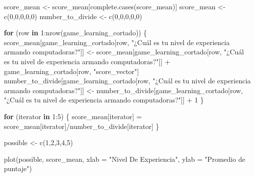 \documentclass[
]{article}
\newenvironment{Shaded}{\begin{snugshade}}{\end{snugshade}}
\newcommand{\AttributeTok}[1]{\textcolor[rgb]{0.77,0.63,0.00}{#1}}
\newcommand{\ControlFlowTok}[1]{\textcolor[rgb]{0.13,0.29,0.53}{\textbf{#1}}}
\newcommand{\DecValTok}[1]{\textcolor[rgb]{0.00,0.00,0.81}{#1}}
\newcommand{\FunctionTok}[1]{\textcolor[rgb]{0.00,0.00,0.00}{#1}}
\newcommand{\NormalTok}[1]{#1}
\newcommand{\OtherTok}[1]{\textcolor[rgb]{0.56,0.35,0.01}{#1}}
\newcommand{\SpecialCharTok}[1]{\textcolor[rgb]{0.00,0.00,0.00}{#1}}
\newcommand{\StringTok}[1]{\textcolor[rgb]{0.31,0.60,0.02}{#1}}
\begin{document}
\begin{Shaded}
\begin{Highlighting}[]
\NormalTok{score\_mean }\OtherTok{\textless{}{-}}\NormalTok{ score\_mean[}\FunctionTok{complete.cases}\NormalTok{(score\_mean)]}
\NormalTok{score\_mean }\OtherTok{\textless{}{-}} \FunctionTok{c}\NormalTok{(}\DecValTok{0}\NormalTok{,}\DecValTok{0}\NormalTok{,}\DecValTok{0}\NormalTok{,}\DecValTok{0}\NormalTok{,}\DecValTok{0}\NormalTok{)}
\NormalTok{number\_to\_divide }\OtherTok{\textless{}{-}} \FunctionTok{c}\NormalTok{(}\DecValTok{0}\NormalTok{,}\DecValTok{0}\NormalTok{,}\DecValTok{0}\NormalTok{,}\DecValTok{0}\NormalTok{,}\DecValTok{0}\NormalTok{)}

\ControlFlowTok{for}\NormalTok{ (row }\ControlFlowTok{in} \DecValTok{1}\SpecialCharTok{:}\FunctionTok{nrow}\NormalTok{(game\_learning\_cortado))}
\NormalTok{\{}
\NormalTok{  score\_mean[game\_learning\_cortado[row, }\StringTok{"¿Cuál es tu nivel de experiencia armando computadoras?"}\NormalTok{]] }\OtherTok{\textless{}{-}}\NormalTok{ score\_mean[game\_learning\_cortado[row, }\StringTok{"¿Cuál es tu nivel de experiencia armando computadoras?"}\NormalTok{]] }\SpecialCharTok{+}\NormalTok{ game\_learning\_cortado[row, }\StringTok{"score\_vector"}\NormalTok{]}
\NormalTok{  number\_to\_divide[game\_learning\_cortado[row, }\StringTok{"¿Cuál es tu nivel de experiencia armando computadoras?"}\NormalTok{]] }\OtherTok{\textless{}{-}}\NormalTok{ number\_to\_divide[game\_learning\_cortado[row, }\StringTok{"¿Cuál es tu nivel de experiencia armando computadoras?"}\NormalTok{]] }\SpecialCharTok{+} \DecValTok{1}
\NormalTok{\}}

\ControlFlowTok{for}\NormalTok{ (iterator }\ControlFlowTok{in} \DecValTok{1}\SpecialCharTok{:}\DecValTok{5}\NormalTok{)}
\NormalTok{\{}
\NormalTok{  score\_mean[iterator] }\OtherTok{=}\NormalTok{ score\_mean[iterator]}\SpecialCharTok{/}\NormalTok{number\_to\_divide[iterator]}
\NormalTok{\}}

\NormalTok{possible }\OtherTok{\textless{}{-}} \FunctionTok{c}\NormalTok{(}\DecValTok{1}\NormalTok{,}\DecValTok{2}\NormalTok{,}\DecValTok{3}\NormalTok{,}\DecValTok{4}\NormalTok{,}\DecValTok{5}\NormalTok{)}

\FunctionTok{plot}\NormalTok{(possible, score\_mean, }\AttributeTok{xlab =} \StringTok{"Nivel De Experiencia"}\NormalTok{, }\AttributeTok{ylab =} \StringTok{"Promedio de puntaje"}\NormalTok{)}
\end{Highlighting}
\end{Shaded}
\end{document}
